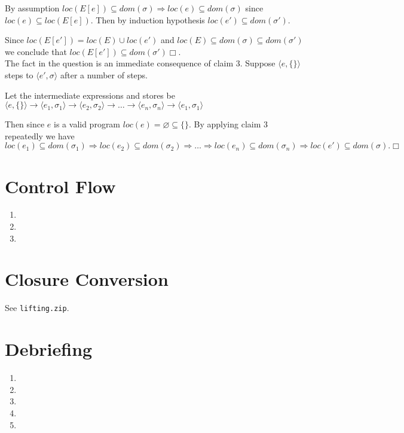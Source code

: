 \documentclass[10pt]{article}
\begin{document}
\begin{enumerate} [(a)]
    By assumption $loc(E[e]) \subseteq dom(\sigma) \Rightarrow loc(e) \subseteq dom(\sigma)$ since $loc(e) \subseteq loc (E[e])$. Then by induction hypothesis $loc(e') \subseteq dom(\sigma')$.

    Since $loc(E[e']) = loc(E) \cup loc(e')$ and $loc(E) \subseteq dom(\sigma) \subseteq dom(\sigma')$ we conclude that $loc(E[e']) \subseteq dom(\sigma')\Box$.\\

    The fact in the question is an immediate consequence of claim 3. Suppose $\langle e, \{\} \rangle$ steps to $\langle e', \sigma \rangle$ after a number of steps. 

    Let the intermediate expressions and stores be $\langle e, \{\} \rangle \rightarrow \langle e_1, \sigma_1 \rangle \rightarrow \langle e_2, \sigma_2 \rangle \rightarrow \ldots \rightarrow \langle e_n, \sigma_n \rangle \rightarrow \langle e_1, \sigma_1 \rangle$

    Then since $e$ is a valid program $loc(e) = \varnothing \subseteq \{\}$. By applying claim 3 repeatedly we have $loc(e_1) \subseteq dom(\sigma_1) \Rightarrow loc(e_2) \subseteq dom(\sigma_2) \Rightarrow \ldots \Rightarrow loc(e_n) \subseteq dom(\sigma_n) \Rightarrow loc(e') \subseteq dom(\sigma). \Box$
\end{enumerate}
\section{Control Flow}%
\begin{enumerate}
    \item
    \item
    \item
\end{enumerate}
\section{Closure Conversion}%
See \texttt{lifting.zip}.
\section{Debriefing}%
\begin{enumerate}
    \item
    \item
    \item
    \item
    \item
\end{enumerate}
\end{document}
